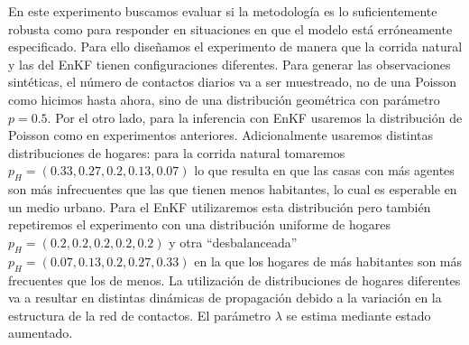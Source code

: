En este experimento buscamos evaluar si la metodología es lo suficientemente robusta como para responder en situaciones en que el modelo está erróneamente especificado. Para ello diseñamos el experimento de manera que la corrida natural y las del EnKF tienen configuraciones diferentes. Para generar las observaciones sintéticas, el número de contactos diarios va a ser muestreado, no de una Poisson como hicimos hasta ahora, sino de una distribución geométrica con parámetro $p = 0.5$. Por el otro lado, para la inferencia con EnKF usaremos la distribución de Poisson como en experimentos anteriores. Adicionalmente usaremos distintas distribuciones de hogares: para la corrida natural tomaremos $p_H = (0.33, 0.27, 0.2, 0.13, 0.07)$ lo que resulta en que las casas con más agentes son más infrecuentes que las que tienen menos habitantes, lo cual es esperable en un medio urbano. Para el EnKF utilizaremos esta distribución pero también repetiremos el experimento con una distribución uniforme de hogares $p_H = (0.2, 0.2, 0.2, 0.2, 0.2)$ y otra ``desbalanceada'' $p_H = (0.07, 0.13, 0.2, 0.27, 0.33)$ en la que los hogares de más habitantes son más frecuentes que los de menos. La utilización de distribuciones de hogares diferentes va a resultar en distintas dinámicas de propagación debido a la variación en la estructura de la red de contactos. El parámetro $\lambda$ se estima mediante estado aumentado.

